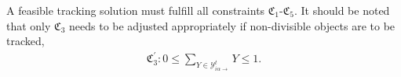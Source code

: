 
A feasible tracking solution must fulfill all constraints $\mathfrak{C}_1$-$\mathfrak{C}_5$. 
It should be noted that only $\mathfrak{C}_3$ needs to be adjusted appropriately if non-divisible objects 
are to be tracked, \ie
\begin{align}
    \mathfrak{C}_3^{\prime} : 0 \le \sum_{Y\in\mathcal{Y}_{i\alpha\rightarrow}^t}Y \le 1.
\end{align}

